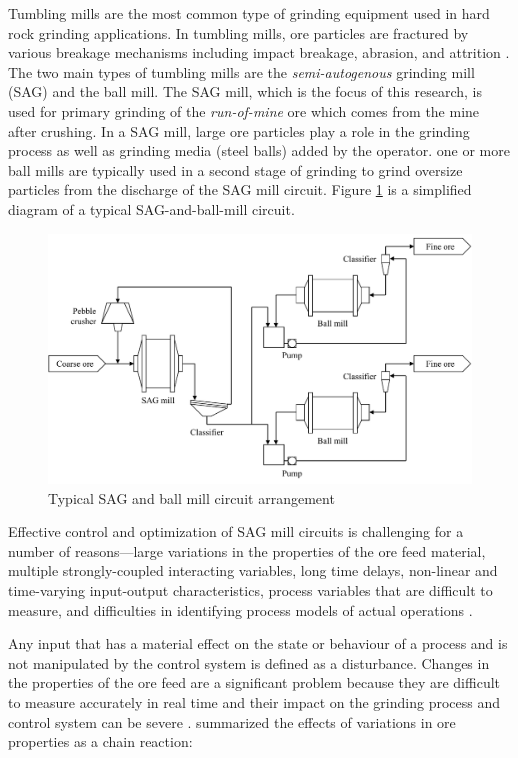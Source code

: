 Tumbling mills are the most common type of grinding equipment used in hard rock grinding applications. In tumbling mills, ore particles are fractured by various breakage mechanisms including impact breakage, abrasion, and attrition \citep{king_chapter_2012}. The two main types of tumbling mills are the \textit{semi-autogenous} grinding mill (\gls{SAG}) and the ball mill. The \gls{SAG} mill, which is the focus of this research, is used for primary grinding of the \textit{run-of-mine} ore which comes from the mine after crushing. In a \gls{SAG} mill, large ore particles play a role in the grinding process as well as grinding media (steel balls) added by the operator. one or more ball mills are typically used in a second stage of grinding to grind oversize particles from the discharge of the \gls{SAG} mill circuit. Figure \ref{fig:sag-ball-circuit-diag} is a simplified diagram of a typical SAG-and-ball-mill circuit.\begin{figure}[htp]
	\centering
	\includegraphics[width=14cm]{images/sag-ball-circuit-diag.pdf}
	\caption{Typical SAG and ball mill circuit arrangement} \label{fig:sag-ball-circuit-diag}
\end{figure}

Effective control and optimization of SAG mill circuits is challenging for a number of reasons---large variations in the properties of the ore feed material, multiple strongly-coupled interacting variables, long time delays, non-linear and time-varying input-output characteristics, process variables that are difficult to measure, and difficulties in identifying process models of actual operations \citep{olivier_dual_2012, gough_sag_2015, le_roux_throughput_2016, aguila-camacho_control_2017}. 

Any input that has a material effect on the state or behaviour of a process and is not manipulated by the control system is defined as a disturbance. Changes in the properties of the ore feed are a significant problem because they are difficult to measure accurately in real time and their impact on the grinding process and control system can be severe \citep{herbst_optimal_1988, garrido_multivariable_2009, remes_grinding_2010, liu_development_2018}. \cite{powell_applying_2009} summarized the effects of variations in ore properties as a chain reaction:

